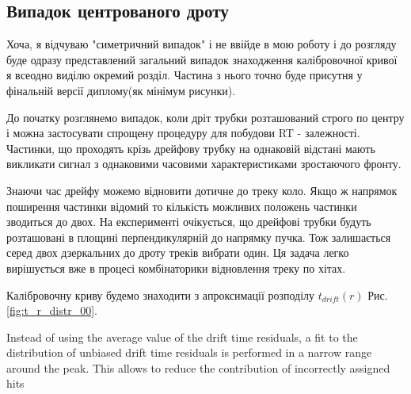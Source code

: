 \documentclass[]{article}
\begin{document}
	\subsection{Випадок центрованого дроту}
	Хоча, я відчуваю "симетричний випадок" і не ввійде в мою роботу і до розгляду буде одразу представлений загальний випадок знаходження калібровочної кривої я всеодно виділю окремий розділ. Частина з нього точно буде присутня у фінальній версії диплому(як мінімум рисунки).
	
	До початку розглянемо випадок, коли дріт трубки розташований строго по центру і можна застосувати спрощену процедуру для побудови RT - залежності. Частинки, що проходять крізь дрейфову трубку на однаковій відстані мають викликати сигнал з однаковими часовими характеристиками зростаючого фронту. 
	
	Знаючи час дрейфу можемо відновити дотичне до треку коло. Якщо ж напрямок поширення частинки відомий то кількість можливих положень частинки зводиться до двох. На експерименті очікується, що дрейфові трубки будуть розташовані в площині перпендикулярній до напрямку пучка. Тож залишається серед двох дзеркальних до дроту треків вибрати один. Ця задача легко вирішується вже в процесі комбінаторики відновлення треку по хітах.
	
	

	
	
	
	Калібровочну криву будемо знаходити з апроксимації розподілу $t_{drift}(r)$ Рис.\ref{fig:t_r_distr_00}.
	
	Instead of using the average value of the drift time residuals, a fit to the distribution of unbiased drift time residuals is performed in a narrow range around the peak. This allows to reduce the contribution of incorrectly assigned hits
\end{document}
